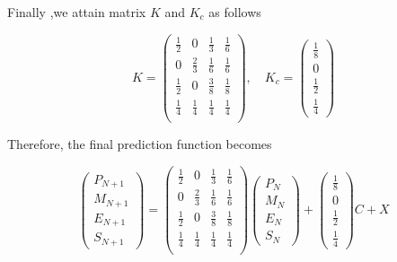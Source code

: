 \documentclass{mcmthesis}
\begin{document}
	Finally ,we attain matrix $K$ and $K_c$ as follows
	\begin{spacing}{1.5}
		$$
		K = 
		\left(
		\begin{matrix}
		\frac{1}{2} & 0 & \frac{1}{3} & \frac{1}{6} \\
		0 & \frac{2}{3} & \frac{1}{6} & \frac{1}{6} \\
		\frac{1}{2} & 0 & \frac{3}{8} & \frac{1}{8} \\
		\frac{1}{4} &\frac{1}{4} & \frac{1}{4} & \frac{1}{4} \\
		\end{matrix}
		\right) 
		, \quad K_c = 
		\left(
		\begin{matrix}
		\frac{1}{8} \\ {0} \\ \frac{1}{2} \\ \frac{1}{4}
		\end{matrix}
		\right) 
		$$
	\end{spacing}
	Therefore, the final prediction function becomes
	\begin{spacing}{1.5}
		\begin{equation}
		\left(
		\begin{matrix}
		P_{N+1} \\ M_{N+1} \\ E_{N+1} \\ S_{N+1}
		\end{matrix}
		\right) 
		= 
		\left(
		\begin{matrix}
		\frac{1}{2} & 0 & \frac{1}{3} & \frac{1}{6} \\
		0 & \frac{2}{3} & \frac{1}{6} & \frac{1}{6} \\
		\frac{1}{2} & 0 & \frac{3}{8} & \frac{1}{8} \\
		\frac{1}{4} &\frac{1}{4} & \frac{1}{4} & \frac{1}{4} \\
		\end{matrix}
		\right) 
		\left(
		\begin{matrix}
		P_N \\ M_N \\ E_N \\ S_N
		\end{matrix}
		\right) 
		+
		\left(
		\begin{matrix}
		\frac{1}{8} \\ {0} \\ \frac{1}{2} \\ \frac{1}{4}
		\end{matrix}
		\right) 
		C
		+ X
		\end{equation}
	\end{spacing}	
	
\end{document}
